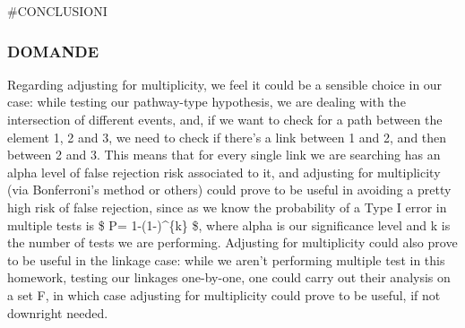 \documentclass[
]{article}
\begin{document}
\#CONCLUSIONI

\hypertarget{domande}{%
\subsubsection{DOMANDE}\label{domande}}

Regarding adjusting for multiplicity, we feel it could be a sensible
choice in our case: while testing our pathway-type hypothesis, we are
dealing with the intersection of different events, and, if we want to
check for a path between the element 1, 2 and 3, we need to check if
there's a link between 1 and 2, and then between 2 and 3. This means
that for every single link we are searching has an alpha level of false
rejection risk associated to it, and adjusting for multiplicity (via
Bonferroni's method or others) could prove to be useful in avoiding a
pretty high risk of false rejection, since as we know the probability of
a Type I error in multiple tests is \$ P= 1-(1-\alpha)\^{}\{k\} \$,
where alpha is our significance level and k is the number of tests we
are performing. Adjusting for multiplicity could also prove to be useful
in the linkage case: while we aren't performing multiple test in this
homework, testing our linkages one-by-one, one could carry out their
analysis on a set F, in which case adjusting for multiplicity could
prove to be useful, if not downright needed.
\end{document}
